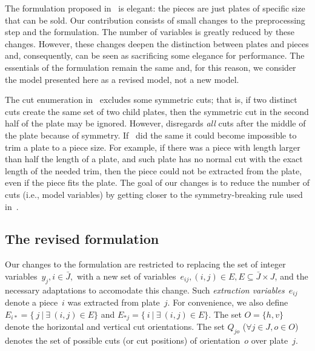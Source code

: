 \documentclass[runningheads]{llncs}
\begin{document}
The formulation proposed in~\cite{furini:2016} is elegant: the pieces are just plates of specific size that can be sold.
Our contribution consists of small changes to the preprocessing step and the formulation.
The number of variables is greatly reduced by these changes.
However, these changes deepen the distinction between plates and pieces and, consequently, can be seen as sacrificing some elegance for performance.
The essentials of the formulation remain the same and, for this reason, we consider the model presented here as a revised model, not a new model.


The cut enumeration in~\cite{furini:2016} excludes some symmetric cuts; that is, if two distinct cuts create the same set of two child plates, then the symmetric cut in the second half of the plate may be ignored.
However, \cite{nicos:1977} disregards \emph{all} cuts after the middle of the plate because of symmetry.
If~\cite{furini:2016} did the same it could become impossible to trim a plate to a piece size.
For example, if there was a piece with length larger than half the length of a plate, and such plate has no normal cut with the exact length of the needed trim, then the piece could not be extracted from the plate, even if the piece fits the plate.
The goal of our changes is to reduce the number of cuts (i.e., model variables) by getting closer to the symmetry-breaking rule used in~\cite{nicos:1977}.


\subsection{The revised formulation}

Our changes to the formulation are restricted to replacing the set of integer variables~\(y_j, i \in \bar{J},\) with a new set of variables~\(e_{ij}, (i, j) \in E, E \subseteq \bar{J} \times J\), and the necessary adaptations to accomodate this change.
Such \emph{extraction variables}~\(e_{ij}\) denote a piece~\(i\) was extracted from plate~\(j\).
For convenience, we also define \(E_{i*} = \{~j~|~\exists~(i, j) \in E \}\) and \(E_{*j} = \{~i~|~\exists~(i, j) \in E \}\).  
The set \(O = \{h, v\}\) denote the horizontal and vertical cut orientations.
The set \(Q_{jo}\) (\(\forall j \in J, o \in O\)) denotes the set of possible cuts (or cut positions) of orientation~\(o\) over plate~\(j\).
\end{document}
